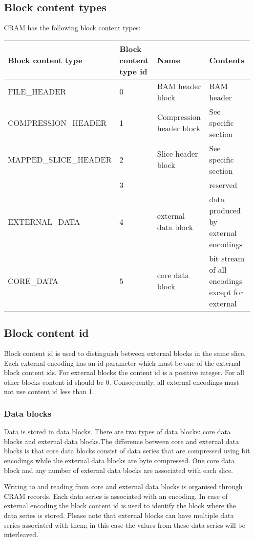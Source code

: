 \documentclass[a4paper]{article}
\begin{document}
\subsection{\textbf{Block content types}}

CRAM has the following block content types:

\begin{tabular}{|>{\raggedright}p{143pt}|>{\raggedright}p{45pt}|>{\raggedright}p{116pt}|>{\raggedright}p{114pt}|}
\hline
\textbf{Block content type} & \textbf{Block content type id} & \textbf{Name} & \textbf{Contents}\tabularnewline
\hline
FILE\_HEADER & 0 & BAM header block & BAM header\tabularnewline
\hline
COMPRESSION\_HEADER & 1 & Compression header block & See specific section\tabularnewline
\hline
MAPPED\_SLICE\_HEADER & 2 & Slice header block & See specific section\tabularnewline
\hline
 & 3 &  & reserved\tabularnewline
\hline
EXTERNAL\_DATA & 4 & external data block & data produced by external encodings\tabularnewline
\hline
CORE\_DATA & 5 & core data block & bit stream of all encodings except for external\tabularnewline
\hline
\end{tabular}


\subsection{\textbf{Block content id}}

Block content id is used to distinguish between external blocks in the same slice. 
Each external encoding has an id parameter which must be one of the external block 
content ids. For external blocks the content id is a positive integer. For all 
other blocks content id should be 0. Consequently, all external encodings must 
not use content id less than 1. 

\subsubsection*{Data blocks}

Data is stored in data blocks. There are two types of data blocks: core data blocks 
and external data blocks.The difference between core and external data blocks is 
that core data blocks consist of data series that are compressed using bit encodings 
while the external data blocks are byte compressed. One core data block and any 
number of external data blocks are associated with each slice.

Writing to and reading from core and external data blocks is organised through 
CRAM records. Each data series is associated with an encoding. In case of external 
encoding the block content id is used to identify the block where the data series 
is stored. Please note that external blocks can have multiple data series associated 
with them; in this case the values from these data series will be interleaved. 
\end{document}

